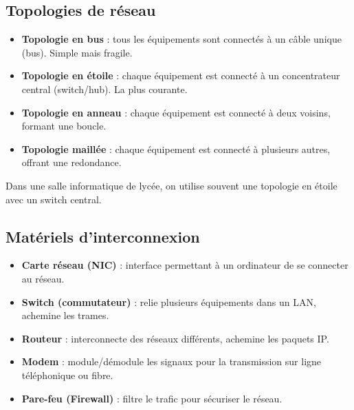 \subsection{Topologies de réseau}
\begin{definition}
\begin{itemize}
    \item \textbf{Topologie en bus} : tous les équipements sont connectés à un câble unique (bus). Simple mais fragile.
    \item \textbf{Topologie en étoile} : chaque équipement est connecté à un concentrateur central (switch/hub). La plus courante.
    \item \textbf{Topologie en anneau} : chaque équipement est connecté à deux voisins, formant une boucle.
    \item \textbf{Topologie maillée} : chaque équipement est connecté à plusieurs autres, offrant une redondance.
\end{itemize}
\end{definition}

\begin{exemple}
Dans une salle informatique de lycée, on utilise souvent une topologie en étoile avec un switch central.
\end{exemple}

\subsection{Matériels d'interconnexion}
\begin{definition}
\begin{itemize}
    \item \textbf{Carte réseau (NIC)} : interface permettant à un ordinateur de se connecter au réseau.
    \item \textbf{Switch (commutateur)} : relie plusieurs équipements dans un LAN, achemine les trames.
    \item \textbf{Routeur} : interconnecte des réseaux différents, achemine les paquets IP.
    \item \textbf{Modem} : module/démodule les signaux pour la transmission sur ligne téléphonique ou fibre.
    \item \textbf{Pare-feu (Firewall)} : filtre le trafic pour sécuriser le réseau.
\end{itemize}
\end{definition}

